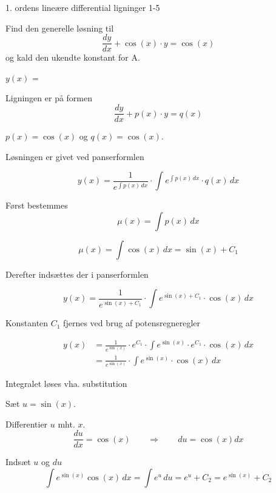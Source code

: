 \documentclass{article}
\begin{document}
\begin{exercise}{1. ordens lineære differential ligninger 1-5}
	
	
	
	
	
	Find den generelle løsning til
	\[
	\frac{dy}{dx} + \cos(x) \cdot y = \cos(x)
	\]
	og kald den ukendte konstant for A.
	
	$y(x)$ =  
	
	
	
	\hint
	
	Ligningen er på formen
	\[
	\frac{dy}{dx} + p(x) \cdot y = q(x)
	\]
	
	\hint
	
	$p(x)=\cos(x)$ og $q(x)=\cos(x)$.
	
	\hint
	
	Løsningen er givet ved panserformlen
	
	
	\hint
	
	\[
	y(x) = \frac{1}{e^{\int p(x) \, dx}} \cdot \int e^{\int p(x) \, dx}  \cdot q(x) \, dx
	\]
	
	\hint
	
	Først bestemmes 
	\[
	\mu(x) = \int p(x) \, dx
	\]
	
	\hint
	\[
	\mu(x) = \int \cos(x) \, dx = \sin(x) + C_1
	\]
	
	\hint
	Derefter indsættes der i  panserformlen
	
	\hint
	
	\[
	y(x) = \frac{1}{e^{\sin(x) + C_1}} \cdot \int e^{\sin(x) + C_1}  \cdot \cos(x) \, dx
	\]
	
	
	\hint
	
	Konstanten $C_1$ fjernes ved brug af potensregneregler
	
	\hint
	\begin{align*}
	y(x) &= \frac{1}{e^{\sin(x)}} \cdot e^{C_1} \cdot \int e^{\sin(x)} \cdot e^{C_1}  \cdot \cos(x) \, dx  \\
	&= \frac{1}{e^{\sin(x)}} \cdot \int e^{\sin(x)}  \cdot \cos(x) \, dx
	\end{align*}
	
	\hint
	
	Integralet løses vha. substitution
	
	
	\hint
	Sæt $u = \sin(x)$.
	
	\hint
	
	Differentier $u$ mht. $x$.
	\[
	\frac{du}{dx} = \cos(x) \qquad	\Rightarrow \qquad du = \cos(x) dx
	\]
	
	\hint 
	Indsæt $u$ og $du$
	\[
	\int e^{\sin(x)} \cos(x) \, dx = \int e^{u} \, du = e^{u} + C_2 = e^{\sin(x)} + C_2
	\]
	

\end{exercise}
\end{document}

